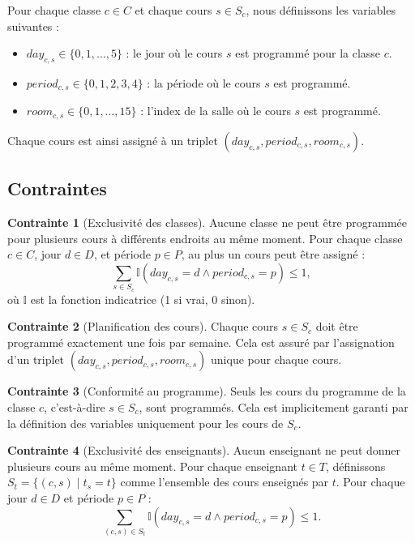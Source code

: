 \documentclass[11pt, a4paper]{article}
\theoremstyle{definition}
\newtheorem{contrainte}{Contrainte}
\begin{document}
Pour chaque classe \( c \in C \) et chaque cours \( s \in S_c \), nous définissons les variables suivantes :
\begin{itemize}
    \item \( day_{c,s} \in \{0, 1, \dots, 5\} \) : le jour où le cours \( s \) est programmé pour la classe \( c \).
    \item \( period_{c,s} \in \{0, 1, 2, 3, 4\} \) : la période où le cours \( s \) est programmé.
    \item \( room_{c,s} \in \{0, 1, \dots, 15\} \) : l'index de la salle où le cours \( s \) est programmé.
\end{itemize}
Chaque cours est ainsi assigné à un triplet \( (day_{c,s}, period_{c,s}, room_{c,s}) \).

\subsection{Contraintes}

\begin{contrainte}[Exclusivité des classes]
Aucune classe ne peut être programmée pour plusieurs cours à différents endroits au même moment. Pour chaque classe \( c \in C \), jour \( d \in D \), et période \( p \in P \), au plus un cours peut être assigné :
\[
\sum_{s \in S_c} \mathbb{I}(day_{c,s} = d \land period_{c,s} = p) \leq 1,
\]
où \( \mathbb{I} \) est la fonction indicatrice (1 si vrai, 0 sinon).
\end{contrainte}

\begin{contrainte}[Planification des cours]
Chaque cours \( s \in S_c \) doit être programmé exactement une fois par semaine. Cela est assuré par l'assignation d'un triplet \( (day_{c,s}, period_{c,s}, room_{c,s}) \) unique pour chaque cours.
\end{contrainte}

\begin{contrainte}[Conformité au programme]
Seuls les cours du programme de la classe \( c \), c'est-à-dire \( s \in S_c \), sont programmés. Cela est implicitement garanti par la définition des variables uniquement pour les cours de \( S_c \).
\end{contrainte}

\begin{contrainte}[Exclusivité des enseignants]
Aucun enseignant ne peut donner plusieurs cours au même moment. Pour chaque enseignant \( t \in T \), définissons \( S_t = \{(c, s) \mid t_s = t\} \) comme l'ensemble des cours enseignés par \( t \). Pour chaque jour \( d \in D \) et période \( p \in P \) :
\[
\sum_{(c,s) \in S_t} \mathbb{I}(day_{c,s} = d \land period_{c,s} = p) \leq 1.
\]
\end{contrainte}
\end{document}

